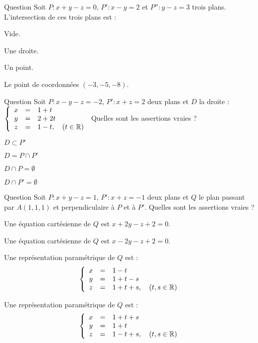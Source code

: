 \begin{multi}[multiple,feedback=
{On résout le système constitué des équations des trois plans.
}]{Question}
Soit \(P : x+y-z=0\),  \(P' : x-y=2\) et \(P'' : y-z=3\) trois plans. L'intersection de ces trois plans est :

    \item Vide.
    \item Une droite.
    \item* Un point.
    \item* Le point de coordonnées \((-3,-5,-8)\).
\end{multi}


\begin{multi}[multiple,feedback=
{On vérifie que  \(D=P\cap P'\).
}]{Question}
Soit \(P : x-y-z=-2\),  \(P' : x+z=2\) deux plans et \(D\) la droite :
\(\left\{\begin{array}{ccl}x&=&1+t\\y&=&2+2t\\ z&=&1-t,\quad (t\in \mathbb{R})\end{array}\right.\) Quelles sont les assertions vraies ?

    \item* \(D\subset P'\)
    \item* \(D=P\cap P'\)
    \item \(D\cap P=\emptyset\)
    \item \(D\cap P'=\emptyset\)
\end{multi}


\begin{multi}[multiple,feedback=
{\(Q\) passe par \(A\) et est dirigé par \(\vec{n}\) et \(\vec{n'}\), où \(\vec{n}\) et \(\vec{n'}\) sont des vecteurs normaux à \(P\) et à \(P'\) respectivement.
}]{Question}
Soit \(P : x+y-z=1\),  \(P' : x+z=-1\) deux plans et \(Q\) le plan passant par \(A(1,1,1)\) et perpendiculaire à \(P\) et à \(P'\). Quelles sont les assertions vraies ?

    \item Une équation cartésienne de \(Q\) est \(x+2y-z+2=0\).
    \item* Une équation cartésienne de \(Q\) est \(x-2y-z+2=0\).
    \item Une représentation paramétrique de \(Q\) est :
\[\left\{\begin{array}{ccl}x&=&1-t\\y&=&1+t-s\\ z&=&1+t+s,\quad (t,s \in \mathbb{R}) \end{array}\right.\]
    \item* Une représentation paramétrique de \(Q\) est :
\[\left\{\begin{array}{ccl}x&=&1+t+s\\y&=&1+t\\ z&=&1-t+s,\quad (t,s \in \mathbb{R}) \end{array}\right.\]
\end{multi}


